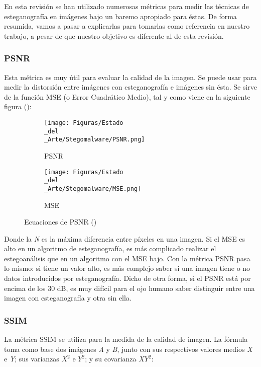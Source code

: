 En esta revisión se han utilizado numerosas métricas para medir las técnicas de esteganografía en imágenes bajo un baremo apropiado para éstas. De forma resumida, vamos a pasar a explicarlas para tomarlas como referencia en nuestro trabajo, a pesar de que nuestro objetivo es diferente al de esta revisión.

\subsubsection{PSNR}

Esta métrica es muy útil para evaluar la calidad de la imagen. Se puede usar para medir la distorsión entre imágenes con esteganografía e imágenes sin ésta. Se sirve de la función \ac{MSE} (o Error Cuadrático Medio), tal y como viene en la siguiente figura (\cite{mse-ssim}): %

\begin{figure}[H]
  \centering
  \begin{subfigure}[H]{0.45\linewidth}
  \centering
  	\texttt{[image: Figuras/Estado\\\_del\\\_Arte/Stegomalware/PSNR.png]}
  	\label{fig:PSNR}
  	\caption{PSNR}
  \end{subfigure}
  \begin{subfigure}[H]{0.45\linewidth}
  \centering
  	\texttt{[image: Figuras/Estado\\\_del\\\_Arte/Stegomalware/MSE.png]}
  	\label{fig:MSE}
  	\caption{MSE}
  \end{subfigure}
  \caption{Ecuaciones de PSNR (\cite{stegomalware})}
\end{figure}

Donde la \textit{N} es la máxima diferencia entre píxeles en una imagen. Si el \ac{MSE} es alto en un algoritmo de esteganografía, es más complicado realizar el estegoanálisis que en un algoritmo con el \ac{MSE} bajo. Con la métrica \ac{PSNR} pasa lo mismo: si tiene un valor alto, es más complejo saber si una imagen tiene o no datos introducidos por esteganografía. Dicho de otra forma, si el \ac{PSNR} está por encima de los 30 dB, es muy difícil para el ojo humano saber distinguir entre una imagen con esteganografía y otra sin ella.

\subsubsection{SSIM}

La métrica \ac{SSIM} se utiliza para la medida de la calidad de imagen. La fórmula toma como base dos imágenes \textit{A} y \textit{B}, junto con sus respectivos valores medios \textit{X} e \textit{Y}; sus varianzas $X^{2}$ e $Y^{2}$; y su covarianza $XY^{2}$:

